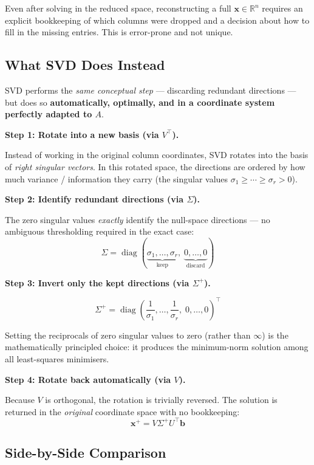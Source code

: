 \documentclass[12pt, a4paper]{article}
\theoremstyle{definition}
\begin{document}
Even after solving in the reduced space, reconstructing a full $\mathbf{x} \in \mathbb{R}^n$
requires an explicit bookkeeping of which columns were dropped and a decision about how to fill in
the missing entries. This is error-prone and not unique.

\subsection{What SVD Does Instead}

SVD performs the \emph{same conceptual step} — discarding redundant directions — but does so
\textbf{automatically, optimally, and in a coordinate system perfectly adapted to $A$}.

\medskip

\textbf{Step 1: Rotate into a new basis (via $V^\top$).}

Instead of working in the original column coordinates, SVD rotates into the basis of
\emph{right singular vectors}. In this rotated space, the directions are ordered by how much
variance / information they carry (the singular values $\sigma_1 \geq \cdots \geq \sigma_r > 0$).

\textbf{Step 2: Identify redundant directions (via $\Sigma$).}

The zero singular values \emph{exactly} identify the null-space directions — no ambiguous
thresholding required in the exact case:
\[
    \Sigma = \operatorname{diag}(\underbrace{\sigma_1, \ldots, \sigma_r}_{\text{keep}},\;
                                  \underbrace{0, \ldots, 0}_{\text{discard}})
\]

\textbf{Step 3: Invert only the kept directions (via $\Sigma^+$).}

\[
    \Sigma^+ = \operatorname{diag}\!\left(\frac{1}{\sigma_1}, \ldots, \frac{1}{\sigma_r},\;
                                           0, \ldots, 0\right)^\top
\]

Setting the reciprocals of zero singular values to zero (rather than $\infty$) is the mathematically
principled choice: it produces the minimum-norm solution among all least-squares minimisers.

\textbf{Step 4: Rotate back automatically (via $V$).}

Because $V$ is orthogonal, the rotation is trivially reversed. The solution is returned in the
\emph{original} coordinate space with no bookkeeping:
\[
    \mathbf{x}^+ = V\Sigma^+ U^\top \mathbf{b}
\]

\subsection{Side-by-Side Comparison}
\end{document}
